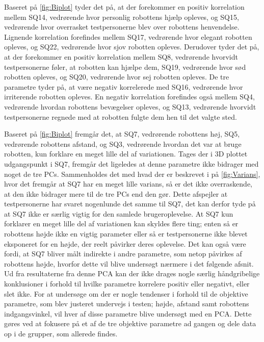 \noindent
%
Baseret på \autoref{fig:Biplot} tyder det på, at der forekommer en positiv korrelation mellem SQ14, vedrørende hvor personlig robottens hjælp opleves, og SQ15, vedrørende hvor overrasket testpersonerne blev over robottens henvendelse. Lignende korrelation forefindes mellem SQ17, vedrørende hvor elegant robotten opleves, og SQ22, vedrørende hvor sjov robotten opleves. Derudover tyder det på, at der forekommer en positiv korrelation mellem SQ8, vedrørende hvorvidt testpersonerne føler, at robotten kan hjælpe dem, SQ19, vedrørende hvor sød robotten opleves, og SQ20, vedrørende hvor sej robotten opleves. De tre parametre tyder på, at være negativ korrelerede med SQ16, vedrørende hvor irriterende robotten opleves. En negativ korrelation forefindes også mellem SQ4, vedrørende hvordan robottens bevægelser opleves, og SQ13, vedrørende hvorvidt testpersonerne regnede med at robotten fulgte dem hen til det valgte sted. 

Baseret på \autoref{fig:Biplot} fremgår det, at SQ7, vedrørende robottens høj, SQ5, vedrørende robottens afstand, og SQ3, vedrørende hvordan det var at bruge robotten, kun forklare en meget lille del af variationen. Tages der i 3D plottet udgangspunkt i SQ7, fremgår det ligeledes at denne parametre ikke bidrager med noget de tre PCs. Sammenholdes det med hvad der er beskrevet i  på \autoref{fig:Varians}, hvor det fremgår at SQ7 har en meget lille varians, så er det ikke overraskende, at den ikke bidrager mere til de tre PCs end den gør. Dette afspejler at testpersonerne har svaret nogenlunde det samme til SQ7, det kan derfor tyde på at SQ7 ikke er særlig vigtig for den samlede brugeroplevelse. At SQ7 kun forklarer en meget lille del af variationen kan skyldes flere ting; enten så er robottens højde ikke en vigtig parameter eller så er testpersonerne ikke blevet eksponeret for en højde, der reelt påvirker deres oplevelse. Det kan også være fordi, at SQ7 bliver målt indirekte i andre parametre, som netop påvirkes af robottens højde, hvorfor dette vil blive undersøgt nærmere i det følgende afsnit.\blankline
%
Ud fra resultaterne fra denne PCA kan der ikke drages nogle særlig håndgribelige konklusioner i forhold til hvilke parametre korrelere positiv eller negativt, eller slet ikke. For at undersøge om der er nogle tendenser i forhold til de objektive parametre, som blev justeret undervejs i testen; højde, afstand samt robottens indgangsvinkel, vil hver af disse parametre blive undersøgt med en PCA. Dette gøres ved at fokusere på et af de tre objektive parametre ad gangen og dele data op i de grupper, som allerede findes.




